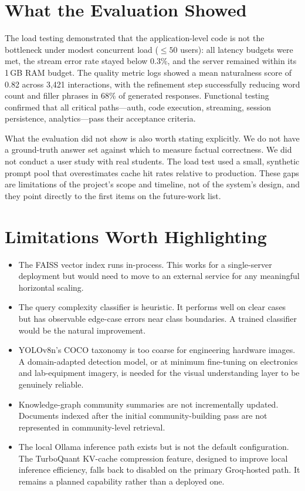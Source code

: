 \section{What the Evaluation Showed}
\label{sec:what-eval-showed}

The load testing demonstrated that the application-level code is not the
bottleneck under modest concurrent load ($\leq 50$ users): all latency budgets
were met, the stream error rate stayed below 0.3\%, and the server remained
within its 1\,GB RAM budget. The quality metric logs showed a mean naturalness
score of 0.82 across 3,421 interactions, with the refinement step successfully
reducing word count and filler phrases in 68\% of generated responses.
Functional testing confirmed that all critical paths---auth, code execution,
streaming, session persistence, analytics---pass their acceptance criteria.

What the evaluation did not show is also worth stating explicitly. We do not
have a ground-truth answer set against which to measure factual correctness. We
did not conduct a user study with real students. The load test used a small,
synthetic prompt pool that overestimates cache hit rates relative to production.
These gaps are limitations of the project's scope and timeline, not of the
system's design, and they point directly to the first items on the future-work
list.

\section{Limitations Worth Highlighting}
\label{sec:limitations-final}

\begin{itemize}
    \item The FAISS vector index runs in-process. This works for a single-server
    deployment but would need to move to an external service for any meaningful
    horizontal scaling.

    \item The query complexity classifier is heuristic. It performs well on
    clear cases but has observable edge-case errors near class boundaries.
    A trained classifier would be the natural improvement.

    \item YOLOv8n's COCO taxonomy is too coarse for engineering hardware images.
    A domain-adapted detection model, or at minimum fine-tuning on electronics
    and lab-equipment imagery, is needed for the visual understanding layer to
    be genuinely reliable.

    \item Knowledge-graph community summaries are not incrementally updated.
    Documents indexed after the initial community-building pass are not
    represented in community-level retrieval.

    \item The local Ollama inference path exists but is not the default
    configuration. The TurboQuant KV-cache compression feature, designed to
    improve local inference efficiency, falls back to disabled on the primary
    Groq-hosted path. It remains a planned capability rather than a deployed one.
\end{itemize}

